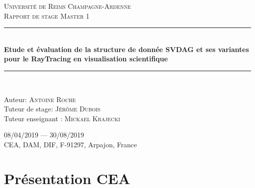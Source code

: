 \documentclass[12pt,a4paper,twoside]{article}
\newcommand{\HRule}{\rule{\linewidth}{0.5mm}}
\begin{document}
\begin{titlepage}
\begin{sffamily}
\begin{center}
\begin{figure}[h]
\begin{minipage}[c]{.46\linewidth}
                    \end{minipage}
                \end{figure}
                \vspace{2cm}
                \textsc{\LARGE Université de Reims Champagne-Ardenne}\\[2cm]
                \textsc{\Large Rapport de stage Master 1}\\[1.5cm]
                \HRule \\[1cm]
                { \Large \bfseries Etude et évaluation de la structure de donnée SVDAG et ses variantes pour le RayTracing en visualisation scientifique \\[0.4cm] }
                \HRule \\[2cm]


                \begin{minipage}{0.8\textwidth}
                    \begin{flushleft}
                        \Large Auteur: \textsc{Antoine Roche}\\
                        Tuteur de stage: \textsc{Jérôme Dubois}\\
                        Tuteur enseignant : \textsc{Mickael Krajecki}\\
                    \end{flushleft}
                \end{minipage}

                \vfill
                \Large 08/04/2019 — 30/08/2019 \\[1cm]
                \Huge {CEA, DAM, DIF, F-91297, Arpajon, France}

            \end{center}
        \end{sffamily}
    \end{titlepage}


    \newpage

    \renewcommand{\contentsname}{Sommaire}

    \tableofcontents


    \newpage

    \lstset{numbers=left, tabsize=3, frame=single, numberstyle=\ttfamily,
    basicstyle=\footnotesize}
    \thispagestyle{empty}

    \section{Présentation CEA}                              %
\end{document}
